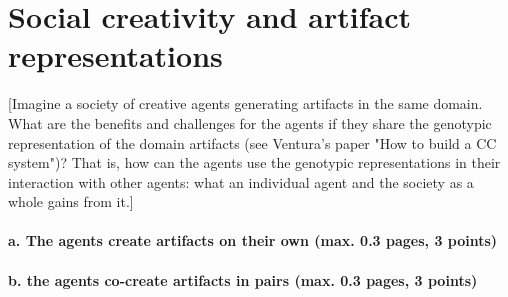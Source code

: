 \documentclass[english]{tktltiki}
\begin{document}
    \section{Social creativity and artifact representations}
    
    [Imagine a society of creative agents generating artifacts in the same domain. 
    What are the benefits and challenges for the agents if they share the genotypic 
    representation of the domain artifacts (see Ventura's paper "How to build a CC system")? 
    That is, how can the agents use the genotypic representations in their interaction 
    with other agents: what an individual agent and the society as a whole gains from it.]
    
    \paragraph{a. The agents create artifacts on their own (max. 0.3 pages, 3 points)}
    
    \paragraph{b. the agents co-create artifacts in pairs (max. 0.3 pages, 3 points)}
    
    
\end{document}
